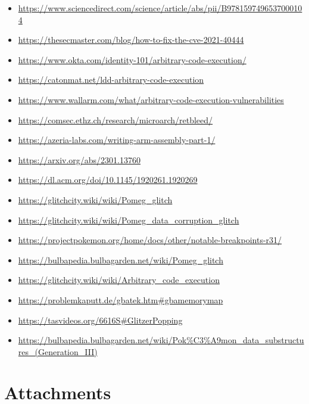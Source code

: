 \documentclass[a4paper]{usiinfbachelorproject}
\begin{document}


\begin{itemize}
	\item \url{https://www.sciencedirect.com/science/article/abs/pii/B9781597496537000104}
	\item \url{https://thesecmaster.com/blog/how-to-fix-the-cve-2021-40444}
	\item \url{https://www.okta.com/identity-101/arbitrary-code-execution/}
	\item \url{https://catonmat.net/ldd-arbitrary-code-execution}
	\item \url{https://www.wallarm.com/what/arbitrary-code-execution-vulnerabilities}
	\item \url{https://comsec.ethz.ch/research/microarch/retbleed/}
	\item \url{https://azeria-labs.com/writing-arm-assembly-part-1/}
	\item \url{https://arxiv.org/abs/2301.13760}
	\item \url{https://dl.acm.org/doi/10.1145/1920261.1920269}
	\item \url{https://glitchcity.wiki/wiki/Pomeg_glitch}
	\item \url{https://glitchcity.wiki/wiki/Pomeg_data_corruption_glitch}
	\item \url{https://projectpokemon.org/home/docs/other/notable-breakpoints-r31/}
	\item \url{https://bulbapedia.bulbagarden.net/wiki/Pomeg_glitch}
	\item \url{https://glitchcity.wiki/wiki/Arbitrary_code_execution}
	\item \url{https://problemkaputt.de/gbatek.htm#gbamemorymap}
	\item \url{https://tasvideos.org/6616S#GlitzerPopping}
	\item \url{https://bulbapedia.bulbagarden.net/wiki/Pok\%C3\%A9mon_data_substructures_(Generation\_III)}
\end{itemize}

\section{Attachments}
\end{document}
